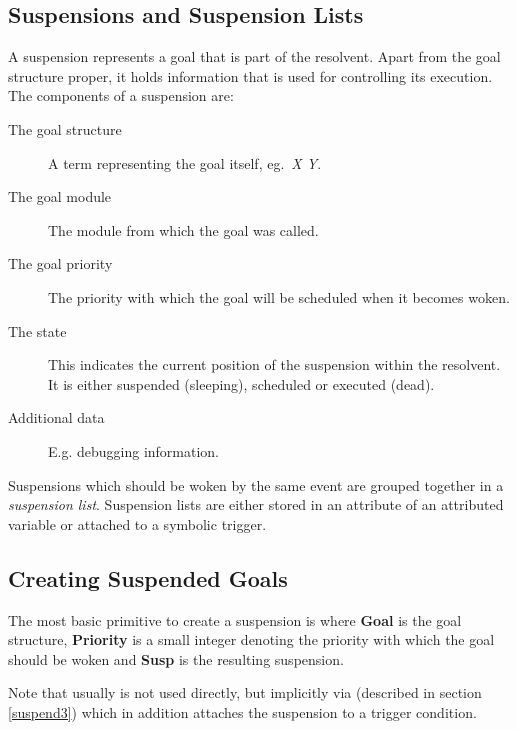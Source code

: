 
\subsection{Suspensions and Suspension Lists}
A suspension represents a goal that is part of the resolvent.
Apart from the goal structure proper, it holds information that
is used for controlling its execution.
The components of a suspension are:
\begin{description}
\item[The goal structure]
        A term representing the goal itself, eg.\ {\em X \gt Y}.
\item[The goal module]
        The module from which the goal was called.
\item[The goal priority]
        The priority with which the goal will be scheduled when
        it becomes woken.
\item[The state]
        This indicates the current position of the suspension within
        the resolvent. It is either suspended (sleeping), scheduled
	or executed (dead).
\item[Additional data]
	E.g. debugging information.
\end{description}

Suspensions which should be woken by the same event are grouped
together in a {\it suspension list}.
Suspension lists are either stored in an attribute of
an attributed variable or attached to a symbolic trigger.


\subsection{Creating Suspended Goals}
The most basic primitive to create a suspension is
where {\bf Goal} is the goal structure,
{\bf Priority} is a small integer denoting the priority with which
the goal should be woken and {\bf Susp} is the resulting suspension.

Note that usually
is not used directly, but implicitly via
(described in section \ref{suspend3}) which in addition attaches the suspension to a
trigger condition.

